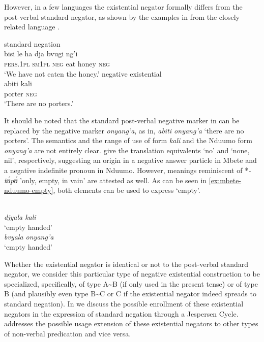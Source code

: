\documentclass[output=paper,draft,draftmode,colorlinks,citecolor=brown]{langscibook}
\begin{document}
However, in a few languages the existential
negator formally differs from the post-verbal standard negator, as shown by
the examples in  from the closely related
language .


\ea\label{ex:mbete-honey-porter}  \ea standard negation\\
\gll bisi le ha dja bvugi ng'i\\
\textsc{pers.1pl} \textsc{sm1pl} \textsc{neg} eat honey \textsc{neg}\\
\glt
`We have not eaten the honey.'
\ex negative existential\\
\gll abiti kali\\
porter \textsc{neg}\\
\glt 	`There are no porters.'
\z
\z

It should be noted
that the  standard post-verbal negative marker in
 can be replaced by the negative marker
\textit{onyang'a}, as in, \textit{abiti onyang'a} `there are no porters'.
The semantics and the range of use of  form \textit{kali} and the
Nduumo form \textit{onyang'a} are not entirely clear. \citet[114,
171]{BitonAdam1969} give the translation equivalents `no' and `none, nil',
respectively, suggesting an origin in a negative answer particle in Mbete
and a negative indefinite pronoun in Nduumo. However, meanings reminiscent
of *\textit{-t{\'ʊ}p{\'ʊ}} 'only, empty, in vain' are attested as well. As can be seen in
\ref{ex:mbete-nduumo-empty}, both elements can be used to express `empty'.

\ea\label{ex:mbete-nduumo-empty}

\ea{}\\
\textit{djyala kali}\\ 
\glt `empty handed'
\ex{}\\ 
\textit{bvyala onyang'a}\\ 
\glt `empty handed'
\z
\z


%
Whether the existential negator is identical or
not to the post-verbal standard negator, we consider this particular type
of negative existential construction to be specialized, specifically, of type
A{\textasciitilde}B (if only used in the present tense) or of type B (and
plausibly even type B{\textasciitilde}C or C if the existential negator
indeed spreads to standard negation). In  we discuss the
possible enrollment of these existential negators in the expression of
standard negation through a Jespersen Cycle.  addresses
the possible usage extension of these existential negators to other types
of non-verbal predication and vice versa.
\end{document}
